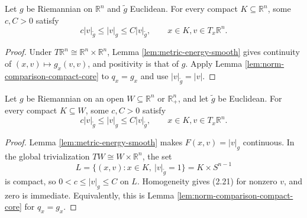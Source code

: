 \begin{lemma}
\label{lem:riemannian-euclidean-norm-comparison-flat}
\leanok
{}
Let $g$ be Riemannian on $\mathbb R^n$ and $\widetilde g$ Euclidean. For every compact $K\subseteq\mathbb R^n$, some $c,C>0$ satisfy
\[
c|v|_{\widetilde g}\le|v|_g\le C|v|_{\widetilde g},
\qquad x\in K, v\in T_x\mathbb R^n.
\]
\end{lemma}
\begin{proof}
\leanok
{}
\sketch Under $T\mathbb R^n\cong\mathbb R^n\times\mathbb R^n$, Lemma \ref{lem:metric-energy-smooth} gives continuity of $(x,v)\mapsto g_x(v,v)$, and positivity is that of $g$. Apply Lemma \ref{lem:norm-comparison-compact-core} to $q_x=g_x$ and use $|v|_{\widetilde g}=|v|$.
\end{proof}

\begin{lemma}
\label{lem:riemannian-euclidean-norm-comparison}
\leanok
{}
Let $g$ be Riemannian on an open $W\subseteq\mathbb R^n$ or $\mathbb R^n_+$, and let $\widetilde g$ be Euclidean. For every compact $K\subseteq W$, some $c,C>0$ satisfy
\begin{equation}
c|v|_{\widetilde g}\le|v|_g\le C|v|_{\widetilde g},
\qquad x\in K, v\in T_x\mathbb R^n.
\tag{2.21}
\end{equation}
\end{lemma}
\begin{proof}
\leanok
{}
\sketch Lemma \ref{lem:metric-energy-smooth} makes $F(x,v)=|v|_g$ continuous. In the global trivialization $TW\cong W\times\mathbb R^n$, the set
\[
L=\{(x,v):x\in K,\ |v|_{\widetilde g}=1\}=K\times S^{n-1}
\]
is compact, so $0<c\le|v|_g\le C$ on $L$. Homogeneity gives (2.21) for nonzero $v$, and zero is immediate. Equivalently, this is Lemma \ref{lem:norm-comparison-compact-core} for $q_x=g_x$.
\end{proof}

